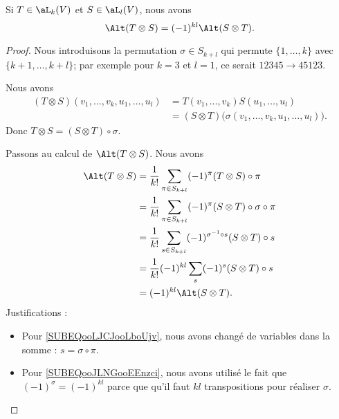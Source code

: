 \begin{lemma}		\label{LEMooIMYIooZIxYRp}
	Si \( T\in\aL_k(V)\) et \( S\in \aL_l(V)\), nous avons
	\begin{equation}
		\Alt(T\otimes S)=(-1)^{kl}\Alt(S\otimes T).
	\end{equation}
\end{lemma}

\begin{proof}
	Nous introduisons la permutation \( \sigma\in S_{k+l}\) qui permute \( \{ 1,\ldots,k \}\) avec \( \{ k+1,\ldots,k+l \}\); par exemple pour \( k=3\) et \( l=1\), ce serait \( 12345\to 45123\).

	Nous avons
	\begin{subequations}
		\begin{align}
			(T\otimes S)(v_1,\ldots,v_k,u_1,\ldots,u_l) & =T(v_1,\ldots,v_k)S(u_1,\ldots, u_l)                            \\
			                                            & =(S\otimes T)\big( \sigma(v_1,\ldots,v_k,u_1,\ldots,u_l) \big).
		\end{align}
	\end{subequations}
	Donc \( T\otimes S=(S\otimes T)\circ \sigma\).

	Passons au calcul de \( \Alt(T\otimes S)\). Nous avons
	\begin{subequations}
		\begin{align}
			\Alt(T\otimes S) & =\frac{1}{ k!}\sum_{\pi\in S_{k+l}}(-1)^{\pi}(T\otimes S)\circ\pi                                        \\
			                 & = \frac{1}{ k!}\sum_{\pi\in S_{k+l}}(-1)^{\pi}(S\otimes T)\circ\sigma\circ\pi                            \\
			                 & =\frac{1}{ k!}\sum_{s\in S_{k+l}}(-1)^{\sigma^{-1}\circ s}(S\otimes T)\circ s		\label{SUBEQooLJCJooLboUjv} \\
			                 & =\frac{1}{ k!}(-1)^{kl}\sum_s(-1)^{s}(S\otimes T)\circ s			\label{SUBEQooJLNGooEEnzci}                      \\
			                 & =(-1)^{kl}\Alt(S\otimes T).
		\end{align}
	\end{subequations}
	Justifications :
	\begin{itemize}
		\item
		      Pour \eqref{SUBEQooLJCJooLboUjv}, nous avons changé de variables dans la somme : \( s=\sigma\circ \pi\).
		\item
		      Pour \eqref{SUBEQooJLNGooEEnzci}, nous avons utilisé le fait que \( (-1)^{\sigma}=(-1)^{kl}\) parce que qu'il faut \( kl\) transpositions pour réaliser \( \sigma\).
	\end{itemize}
\end{proof}

